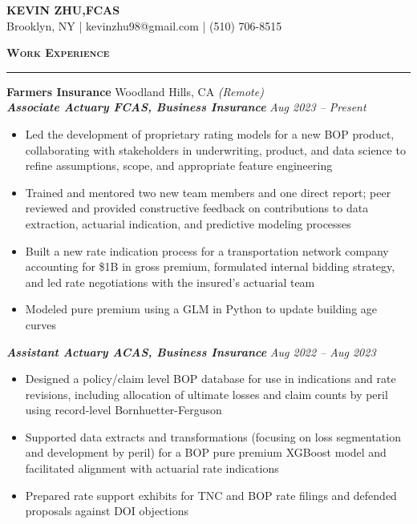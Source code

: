 \documentclass[11pt,letterpaper]{article}
\newcommand{\sectline}{\vspace{5pt}\hrule height 1.5pt\vspace{5pt}}
\newcommand{\sectspace}{\vspace{9pt}}
\newcommand{\heading}[1]{{\fontsize{14pt}{13pt} {\textbf{\textsc{#1}}}}}
\begin{document}
\centering
{\fontsize{14pt}{13pt}\selectfont \textbf{KEVIN ZHU,\hspace{1.7 mm}FCAS}} \vspace{2pt} \\

{\fontsize{12pt}{13pt}\selectfont Brooklyn, NY | kevinzhu98@gmail.com | (510) 706-8515}
\sectspace

\fontsize{11pt}{13.7pt}\selectfont
\raggedright

\heading{Work Experience}\sectline
\textbf{Farmers Insurance} \hfill Woodland Hills, CA \textit{(Remote)}\\
\textbf{\textit{Associate Actuary FCAS, Business Insurance}} \hfill \textit{Aug 2023 -- Present}
\begin{itemize}
	\item Led the development of proprietary rating models for a new BOP product, collaborating with stakeholders in underwriting, product, and data science to refine assumptions, scope, and appropriate feature engineering
	\item Trained and mentored two new team members and one direct report; peer reviewed and provided constructive feedback on contributions to data extraction, actuarial indication, and predictive modeling processes
	\item Built a new rate indication process for a transportation network company accounting for \$1B in gross premium, formulated internal bidding strategy, and led rate negotiations with the insured's actuarial team
	\item Modeled pure premium using a GLM in Python to update building age curves 
\end{itemize}
\textbf{\textit{Assistant Actuary ACAS, Business Insurance}} \hfill \textit{Aug 2022 -- Aug 2023}
\begin{itemize}
	\item Designed a policy/claim level BOP database for use in indications and rate revisions, including allocation of ultimate losses and claim counts by peril using record-level Bornhuetter-Ferguson
	\item Supported data extracts and transformations (focusing on loss segmentation and development by peril) for a BOP pure premium XGBoost model and facilitated alignment with actuarial rate indications
	\item Prepared rate support exhibits for TNC and BOP rate filings and defended proposals against DOI objections
\end{itemize}
\end{document}
